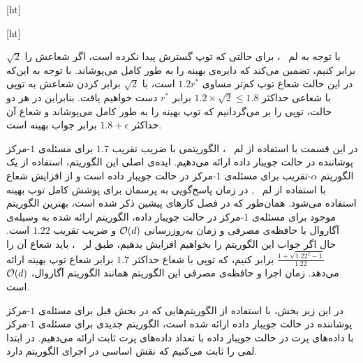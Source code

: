 [ht]



[ht]

با توجه به لم ~، برای حالتی که توپ گسترش پیدا نکرده است، اگر شعاعش را $\sqrt{2}$ برابر کنیم، تضمین می‌کند که دایره‌ی بهینه را به طور کامل می‌پوشاند.
با توجه به این‌که در این حالت شعاع توپ کم‌تر مساوی $1.2r^*$ است، با $\sqrt{2}$ برابر کردن شعاعش به توپی با شعاعی حداکثر $1.2 \times \sqrt{2} \leq 1.8$ برابر $r^*$ دست خواهیم یافت.
بنابراین در هر دو حالت، توپی را بر می‌گردانیم که توپ بهینه را به طور کامل می‌پوشاند و شعاع آن حداکثر $1.8 + \epsilon$ برابر جواب بهینه است.


در این قسمت با استفاده از لم ~، الگوریتمی با ضریب تقریب $1.7$ برای مسئله‌ی $1$-مرکز پوشاننده در حالت جویبار داده ارائه می‌دهیم.
ایده‌ی اصلی این الگوریتم، استفاده از یک الگوریتم $\alpha$-تقریب برای مسئله‌ی $1$-مرکز در حالت جویبار داده است و از افزایش شعاع با استفاده از لم ~, در زمان پاسخ‌گویی به پرسمان برای پوشش کامل توپ بهینه استفاده می‌شود.
همان‌طور که در فصل کارهای پیشین ذکر شده است، بهترین الگوریتم موجود برای مسئله‌ی $1$-مرکز در حالت جویبار داده، الگوریتم ارائه شده به وسیله‌ی آگاروال با حافظه‌ی مصرفی و زمان به‌روزرسانی $\mathcal{O}(d)$ و ضریب تقریب $1.22$ است.
حال اگر جواب این الگوریتم را بخواهیم افزایش بدهیم، طبق لر ~، باید شعاع آن را $\frac{1 + \sqrt{1.22^2 - 1}}{1.22}$ برابر کنیم، که توپی با شعاع حداکثر $1.7$ برابر شعاع توپ بهینه ارائه می‌دهد.
زمان اجرا و حافظه‌ی مصرفی این الگوریتم همانند الگوریتم آگاروال، $\mathcal{O}(d)$ است.


در این زیر بخش، با استفاده از الگوریتم‌هایی که در بخش قبل برای مسئله‌ی $1$-مرکز پوشاننده در حالت جویبار داده ارائه شده است، الگوریتم جدیدی برای مسئله‌ی $1$-مرکز با داده‌های پرت در حالت جویبار داده با تعداد داده‌های پرت ثابت ارائه می‌دهیم.
در ابتدا لمی را ثابت می‌کنیم که نقش اساسی در اجرای الگوریتم دارد.


